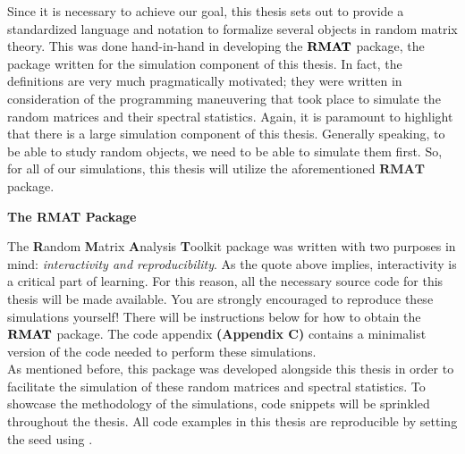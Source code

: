Since it is necessary to achieve our goal, this thesis sets out to provide a standardized language and notation to formalize several objects in random matrix theory.
This was done hand-in-hand in developing the ${\textbf{RMAT}}$ package, the package written for the simulation component of this thesis.
In fact, the definitions are very much pragmatically motivated;
they were written in consideration of the programming maneuvering that took place to simulate the random matrices and their spectral statistics.
Again, it is paramount to highlight that there is a large simulation component of this thesis. Generally speaking, to be able to study random objects, we need to be able to simulate them first.
So, for all of our simulations, this thesis will utilize the aforementioned $\textbf{RMAT}$ package.

\newpage
%

\vspace*{0.1em}
{\Large \textbf{The RMAT Package}\par}

The \textbf{R}andom \textbf{M}atrix \textbf{A}nalysis \textbf{T}oolkit package was written with two purposes in mind: \textit{interactivity and reproducibility}.
As the quote above implies, interactivity is a critical part of learning.
For this reason, all the necessary source code for this thesis will be made available. You are strongly encouraged to reproduce these simulations yourself!
There will be instructions below for how to obtain the ${\textbf{RMAT}}$ package. The code appendix \textbf{(Appendix C)} contains a minimalist version of the code
needed to perform these simulations.\\

As mentioned before, this package was developed alongside this thesis in order to facilitate the simulation of these random matrices and spectral statistics.
To showcase the methodology of the simulations, code snippets will be sprinkled throughout the thesis. All code examples in this thesis are reproducible by setting
the seed using . \\

